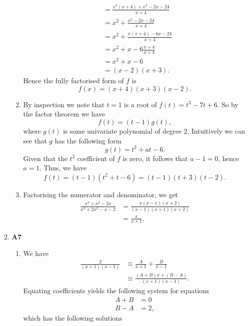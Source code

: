 \documentclass[12pt,oneside]{book}
\begin{document}
\begin{enumerate}
\begin{enumerate}
\begin{align*}
                &= \frac{x^2 (x + 4) + x^2 - 2x - 24}{x+4} \\
                &= x^2 + \frac{x^2 -2 x - 24}{x+4} \\
                &= x^2 + \frac{x(x + 4) -6x - 24}{x+ 4} \\
                &= x^2 + x - 6\frac{x+ 4}{x+4} \\
                &= x^2 + x - 6 \\
                &= (x - 2) (x + 3).
            \end{align*}
            Hence the fully factorised form of $f$ is \[
                f(x) = (x + 4)(x + 3)(x - 2)
            .\] 
            \item By inspection we note that $t = 1$ is a root of $f(t) = t^3 - 7t + 6$. So by the factor theorem we have \[
                f(t) = (t - 1) g(t)
            ,\] where $g(t)$ is some univariate polynomial of degree 2. Intuitively we can see that $g$ has the following form \[
                g(t) = t^2 + at - 6
            .\]  Given that the $t^2$ coefficient of $f$ is zero, it follows that $a - 1 = 0$, hence $a = 1$. Thus, we have \[
                f(t) = (t - 1) (t^2 + t - 6) = (t-1) (t+3) (t-2)
            .\] 
            \item Factorising the numerator and denominator, we get \begin{align*}
                \frac{x^3 + x^2 - 2x}{x^3 + 2x^2 - x - 2} &= \frac{x(x - 1)(x + 2)}{(x - 1)(x + 1)(x + 2)} \\
                &= \frac{x}{x+1}.
            \end{align*}
        \end{enumerate}
        \item \textbf{A7} \begin{enumerate}
            \item We have \begin{align*}
                \frac{2}{(x+1)(x-1)} &\equiv \frac{A}{x+1} + \frac{B}{x-1} \\
                &\equiv \frac{(A+B)x + (B - A)}{(x+1)(x-1)}.
            \end{align*}
            Equating coefficients yields the following system for equations \begin{align*}
                A + B &= 0 \\
                B - A &= 2,
            \end{align*}
            which has the following solutions
            \begin{align*}

\end{align*}
\end{enumerate}
\end{enumerate}
\end{document}
